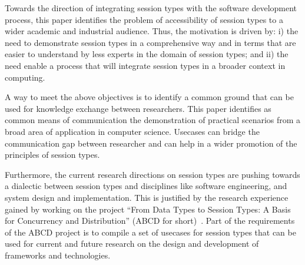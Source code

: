Towards the direction of integrating session types with
the software development process, this paper identifies the problem of accessibility
of session types to a wider academic and industrial audience. 
Thus, the motivation is driven by:
i) the need to demonstrate session types in a comprehensive way and in
terms that are easier to understand by less experts in the domain of
session types; and ii) the need enable a process that will
integrate session types in a broader context in computing.

A way to meet the above objectives is to identify a common
ground that can be used for knowledge exchange between researchers.
This paper identifies as common means of communication the demonstration
of practical scenarios from a broad area of application in computer science.
Usecases can bridge the communication gap between researcher and can help
in a wider promotion of the principles of session types.

Furthermore, the current research directions on session types are
pushing towards a dialectic between session types and disciplines
like software engineering, and system design and implementation.
This is justified by the research experience gained by working
on the project
``From Data Types to Session Types: A Basis for Concurrency and Distribution''
(ABCD for short)~\cite{ABCD}.
Part of the requirements of the ABCD project is to compile a set of usecases
for session types that can be used for current and future research on
the design and development of frameworks and technologies.

